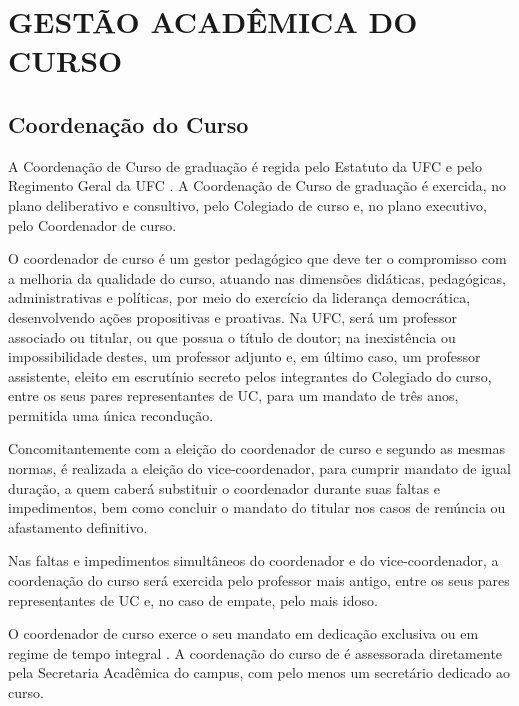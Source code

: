 \chapter{GESTÃO ACADÊMICA DO CURSO}
\label{cap:gestao-academica-do-curso}
\section{Coordenação do Curso}

A Coordenação de Curso de graduação é regida pelo Estatuto da UFC \cite{ufc2025estatuto} e pelo Regimento Geral da UFC \cite{ufc_regimento_geral_2019}. A Coordenação de Curso de graduação é exercida, no plano deliberativo e consultivo, pelo Colegiado de curso e, no plano executivo, pelo Coordenador de curso.

O coordenador de curso é um gestor pedagógico que deve ter o compromisso com a melhoria da qualidade do curso, atuando nas dimensões didáticas, pedagógicas, administrativas e políticas, por meio do exercício da liderança democrática, desenvolvendo ações propositivas e proativas. Na UFC, será um professor associado ou titular, ou que possua o título de doutor; na inexistência ou impossibilidade destes, um professor adjunto e, em último caso, um professor assistente, eleito em escrutínio secreto pelos integrantes do Colegiado do curso, entre os seus pares representantes de UC, para um mandato de três anos, permitida uma única recondução.

Concomitantemente com a eleição do coordenador de curso e segundo as mesmas normas, é realizada a eleição do vice-coordenador, para cumprir mandato de igual duração, a quem caberá substituir o coordenador durante suas faltas e impedimentos, bem como concluir o mandato do titular nos casos de renúncia ou afastamento definitivo.

Nas faltas e impedimentos simultâneos do coordenador e do vice-coordenador, a coordenação do curso será exercida pelo professor mais antigo, entre os seus pares representantes de UC e, no caso de empate, pelo mais idoso.

O coordenador de curso exerce o seu mandato em dedicação exclusiva ou em regime de tempo integral \cite[p. 30]{ufc2025estatuto}. A coordenação do curso de \nomedocurso é assessorada diretamente pela Secretaria Acadêmica do campus, com pelo menos um secretário dedicado ao curso.

